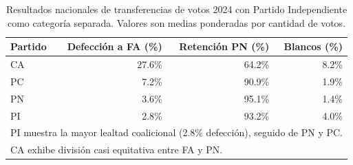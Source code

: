 \begin{table}[H]
\centering
\caption{Resultados nacionales de transferencias de votos 2024 con Partido Independiente como categoría separada. Valores son medias ponderadas por cantidad de votos.}
\label{tab:pi_national_2024}
\begin{tabular}{lrrr}
\toprule
\textbf{Partido} & \textbf{Defección a FA (\%)} & \textbf{Retención PN (\%)} & \textbf{Blancos (\%)} \\
\midrule
CA & 27.6\% & 64.2\% & 8.2\% \\
PC & 7.2\% & 90.9\% & 1.9\% \\
PN & 3.6\% & 95.1\% & 1.4\% \\
PI & 2.8\% & 93.2\% & 4.0\% \\
\bottomrule
\multicolumn{4}{l}{\footnotesize PI muestra la mayor lealtad coalicional (2.8\% defección), seguido de PN y PC.} \\
\multicolumn{4}{l}{\footnotesize CA exhibe división casi equitativa entre FA y PN.} \\
\end{tabular}
\end{table}
